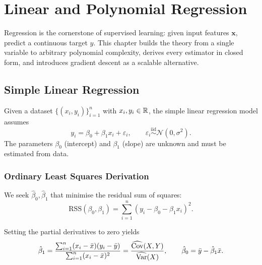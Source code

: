 \chapter{Linear and Polynomial Regression}\label{ch:regression}

\begin{intuition}[title=\textbf{Chapter Overview}]
Regression is the cornerstone of supervised learning: given input features $\bm{x}$, predict a continuous target $y$. This chapter builds the theory from a single variable to arbitrary polynomial complexity, derives every estimator in closed form, and introduces gradient descent as a scalable alternative.
\end{intuition}

\section{Simple Linear Regression}

\begin{definition}
Given a dataset $\{(x_i, y_i)\}_{i=1}^{n}$ with $x_i, y_i \in \mathbb{R}$, the simple linear regression model assumes
\[
    y_i = \beta_0 + \beta_1 x_i + \varepsilon_i, \qquad \varepsilon_i \overset{\text{iid}}{\sim} \mathcal{N}(0, \sigma^2).
\]
The parameters $\beta_0$ (intercept) and $\beta_1$ (slope) are unknown and must be estimated from data.
\end{definition}

\subsection{Ordinary Least Squares Derivation}

We seek $\hat{\beta}_0, \hat{\beta}_1$ that minimise the residual sum of squares:
\[
    \text{RSS}(\beta_0, \beta_1)
    = \sum_{i=1}^{n} (y_i - \beta_0 - \beta_1 x_i)^2.
\]

\begin{theorem}
Setting the partial derivatives to zero yields
\[
    \hat{\beta}_1 = \frac{\sum_{i=1}^{n}(x_i - \bar{x})(y_i - \bar{y})}{\sum_{i=1}^{n}(x_i - \bar{x})^2}
    = \frac{\widehat{\mathrm{Cov}}(X,Y)}{\widehat{\mathrm{Var}}(X)},
    \qquad
    \hat{\beta}_0 = \bar{y} - \hat{\beta}_1 \bar{x}.
\]
\end{theorem}

